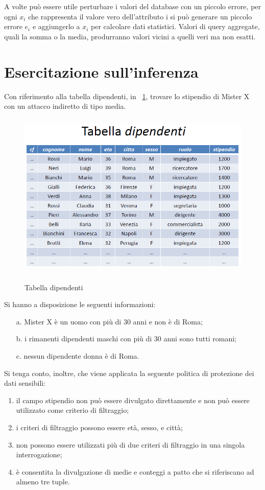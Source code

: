 A volte può essere utile perturbare i valori del database con un piccolo errore, per ogni $x_{i}$ che rappresenta il valore vero dell'attributo i si può generare un piccolo errore $e_{i}$ e aggiungerlo a $x_{i}$ per calcolare dati statistici.
Valori di query aggregate, quali la somma o la media, produrranno valori vicini a quelli veri ma non esatti.

\section{Esercitazione sull'inferenza}
Con riferimento alla tabella dipendenti, in \figurename ~\ref{fig:Tabella_dipendenti}, trovare lo stipendio di Mister X con un attacco indiretto di tipo media. \newline
\begin{figure}[htbp]
	\centering%
	\subfigure%
	{\includegraphics[height=8cm, width=12cm, keepaspectratio]{Immagini/dati_sensibili/Tabella_dipendenti.png}}
	\caption{Tabella dipendenti\label{fig:Tabella_dipendenti}} 	
\end{figure}
Si hanno a disposizione le seguenti informazioni:
\begin{enumerate}
\item [a.] Mister X è un uomo con più di 30 anni e non è di Roma;
\item [b.] i rimanenti dipendenti maschi con più di 30 anni sono tutti romani;
\item [c.] nessun dipendente donna è di Roma.
\end{enumerate}
Si tenga conto, inoltre, che viene applicata la seguente politica di protezione dei dati sensibili:
\begin{enumerate}
\item il campo stipendio non può essere divulgato direttamente e non può essere utilizzato come criterio di filtraggio;
\item i criteri di filtraggio possono essere età, sesso, e città;
\item non possono essere utilizzati più di due criteri di filtraggio in una singola interrogazione;
\item è consentita la divulgazione di medie e conteggi a patto che si riferiscano ad almeno tre tuple.
\end{enumerate}
